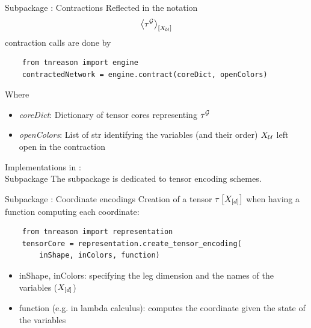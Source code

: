 \documentclass{beamer}
\begin{document}
    \begin{frame}[fragile]{Subpackage \spengine{}: Contractions}
        Reflected in the notation
        \begin{align*}
            \left\langle \tau^{\mathcal{G}}\right\rangle_{\left[ X_{\mathcal{U}} \right]}
        \end{align*}
        contraction calls are done by
        \begin{verbatim}
    from tnreason import engine
    contractedNetwork = engine.contract(coreDict, openColors)
        \end{verbatim}
        Where
        \begin{itemize}
            \item \emph{coreDict}: Dictionary of tensor cores representing $\tau^{\mathcal{G}}$
            \item \emph{openColors}: List of str identifying the variables (and their order) $X_{\mathcal{U}}$ left open in the contraction
        \end{itemize}
    \end{frame}

    \begin{frame}{Implementations in \tnreason{}: \\
    Subpackage \sprepresentation{}}
        The subpackage \sprepresentation{} is dedicated to tensor encoding schemes.
        \begin{center}
        \end{center}
    \end{frame}

    \begin{frame}[fragile]{Subpackage \sprepresentation{}: Coordinate encodings}
        Creation of a tensor $\tau\left[X_{[d]}\right]$ when having a function computing each coordinate:
        \begin{verbatim}
    from tnreason import representation
    tensorCore = representation.create_tensor_encoding(
        inShape, inColors, function)
        \end{verbatim}
        \begin{itemize}
            \item inShape, inColors: specifying the leg dimension and the names of the variables ($X_{[d]}$)
            \item function (e.g. in lambda calculus): computes the coordinate given the state of the variables
        \end{itemize}
    \end{frame}
\end{document}
